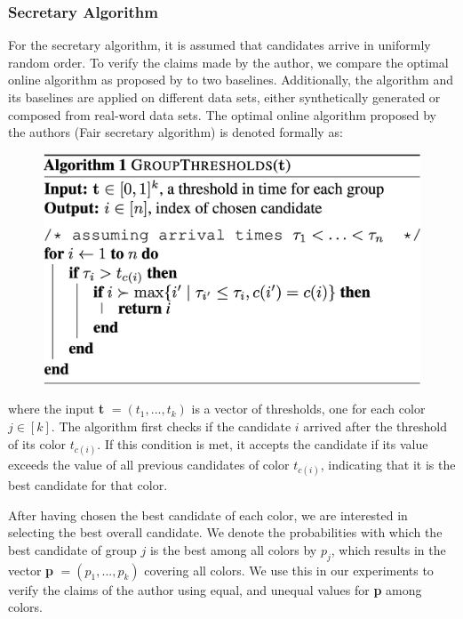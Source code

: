 \subsubsection{Secretary Algorithm}
For the secretary algorithm, it is assumed that candidates arrive in uniformly random order. To verify the claims made by the author, we compare the optimal online algorithm as proposed by \cite{correa2021fairness} to two baselines. Additionally, the algorithm and its baselines are applied on different data sets, either synthetically generated or composed from real-word data sets. The optimal online algorithm proposed by the authors (Fair secretary algorithm) is denoted formally as:
\begin{figure}[H]
    \centering
    \includegraphics[width=0.5\linewidth]{media/algosa.png}
    \label{fig:algosa}
\end{figure}

where the input \textbf{t} $= (t_1, ..., t_k)$ is a vector of thresholds, one for each color $j \in [k]$. The algorithm first checks if the candidate $i$ arrived after the threshold of its color $t_{c(i)}$. If this condition is met, it accepts the candidate if its value exceeds the value of all previous candidates of color $t_{c(i)}$, indicating that it is the best candidate for that color.

After having chosen the best candidate of each color, we are interested in selecting the best overall candidate. We denote the probabilities with which the best candidate of group $j$ is the best among all colors by $p_j$, which results in the vector \textbf{p} $= (p_1,...,p_k)$ covering all colors. We use this in our experiments to verify the claims of the author using equal, and unequal values for \textbf{p} among colors.

